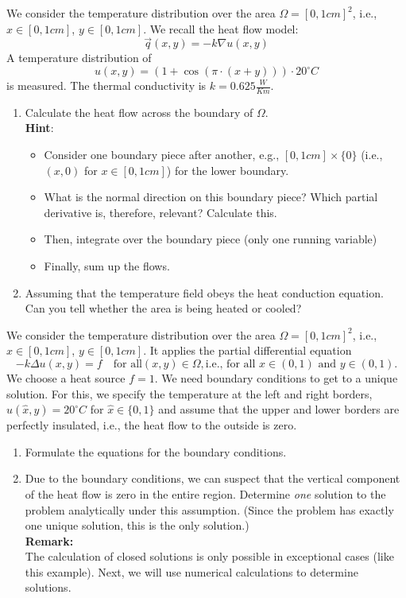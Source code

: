 \documentclass[a4paper,12pt]{article}
\begin{document}
\head{}{}{}

\begin{task}{}
We consider the temperature distribution over the area
$
 \Omega = [0,1 cm]^2 
$, i.e., $ x \in [0,1 cm]$, $ y \in [0,1 cm]$. We recall the heat flow model:
$$
 \vec{q}(x,y) = - k \nabla u(x,y)
$$
A temperature distribution of
$$
 u(x,y) = (1 + \cos(\pi \cdot (x+y))) \cdot 20^\circ C
$$
is measured. The thermal conductivity is $k = 0.625 \frac{W}{K m} $.

\begin{enumerate}
\item Calculate the heat flow across the boundary of $\Omega$. \\
  \textbf{Hint}:
  \begin{itemize}
  \item Consider one boundary piece after another, e.g., $[0,1 cm] \times \{0\}$ (i.e., $(x,0)$ for $x \in [0,1 cm]$) for the lower boundary.
  \item What is the normal direction on this boundary piece? Which partial derivative is, therefore, relevant? Calculate this.
  \item Then, integrate over the boundary piece (only one running variable)
  \item Finally, sum up the flows.
  \end{itemize}
  \item Assuming that the temperature field obeys the heat conduction equation. Can you tell whether the area is being heated or cooled?
\end{enumerate}
\end{task}

\begin{task}{}
We consider the temperature distribution over the area
$
 \Omega = [0,1 cm]^2 
$, i.e., $ x \in [0,1 cm]$, $ y \in [0,1 cm]$. It applies the partial differential equation
$$
  - k \Delta u (x,y) = f \quad \text{for all} (x,y) \in \Omega, \text{i.e., for all } x \in (0,1) \text{ and } y \in (0,1).
$$
We choose a heat source $f=1$. 
We need boundary conditions to get to a unique solution. For this, we specify the temperature at the left and right borders, $u(\hat{x},y)=20^\circ C$ for $\hat{x} \in \{0,1\}$ and assume that the upper and lower borders are perfectly insulated, i.e., the heat flow to the outside is zero.

\begin{enumerate}
\item Formulate the equations for the boundary conditions.
\item Due to the boundary conditions, we can suspect that the vertical component of the heat flow is zero in the entire region. Determine \emph{one} solution to the problem analytically under this assumption. (Since the problem has exactly one unique solution, this is the only solution.) \\
  \textbf{Remark:} \\
  The calculation of closed solutions is only possible in exceptional cases (like this example). Next, we will use numerical calculations to determine solutions.
\end{enumerate}
\end{task}
\end{document}
